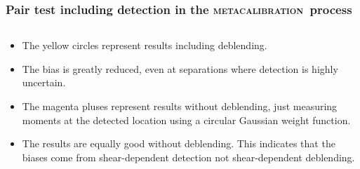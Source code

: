 \documentclass{beamer}
\newcommand{\mcal}{\textsc{metacalibration}}
\begin{document}
\begin{frame}
    \frametitle{Pair test including detection in the \mcal\ process}

 
    \begin{columns}
        \begin{column}{0.5\textwidth}
            \begin{itemize}

                \item The yellow circles represent results including deblending.

                \item The bias is greatly reduced, even at separations where
                    detection is highly uncertain.

                \item The magenta pluses represent results without deblending, just
                    measuring moments at the detected location using a circular
                    Gaussian weight function.

                \item The results are equally good without deblending.  This
                    indicates that the biases come from shear-dependent
                    detection  not shear-dependent deblending.


\end{itemize}
\end{column}
\end{columns}
\end{frame}
\end{document}
